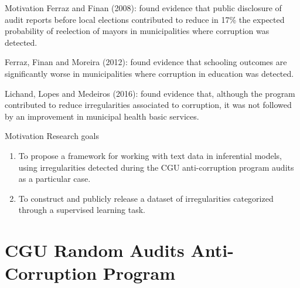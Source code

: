 \documentclass[handout,t,usenames,dvipsnames]{beamer}
\begin{document}
\begin{frame}{Motivation}
\onehalfspacing
\vspace{1em}
\small
\textcolor{emap-azul-escuro}{Ferraz and Finan (2008)\nocite{Eleicoes}}: found evidence that public disclosure of audit reports before local elections contributed to reduce in 17\% the expected probability of reelection of mayors in municipalities where corruption was detected.
\vspace{2em}


\textcolor{emap-azul-escuro}{Ferraz, Finan and Moreira (2012)\nocite{Educacao}}: found evidence that schooling outcomes are significantly worse in municipalities where corruption in education was detected.
\vspace{2em}

\textcolor{emap-azul-escuro}{Lichand, Lopes and Medeiros (2016)\nocite{Saude}}: found evidence that, although the program contributed to reduce irregularities associated to corruption, it was not followed by an improvement in municipal health basic services.

\end{frame}

\begin{frame}{Motivation}
\vspace{0.8em}
{\color{emap-azul-escuro}\Large Research goals}
\doublespacing
\begin{enumerate}
\item To propose a framework for working with text data in inferential models, using irregularities detected during the CGU anti-corruption program audits as a particular case.
\vspace{1em}
\item To construct and publicly release a dataset of irregularities categorized through a supervised learning task.
\end{enumerate}
\end{frame}




\section{CGU Random Audits Anti-Corruption Program}
\end{document}
